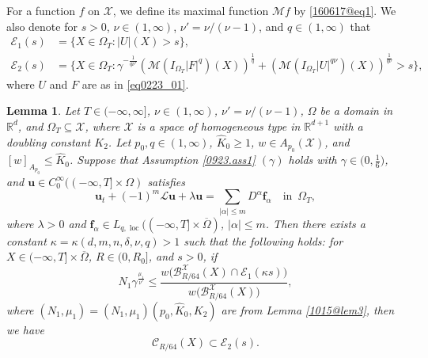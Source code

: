 \documentclass[reqno]{amsart}
\numberwithin{equation}{section}
\theoremstyle{plain}
\newtheorem{lemma}[theorem]{Lemma}
\theoremstyle{definition}
\theoremstyle{remark}
\begin{document}
For a function $f$ on ${\mathcal{X}}$, we define its maximal function ${\mathcal{M}} f$ by \eqref{160617@eq1}.
We also denote for $s>0$,  $\nu\in (1,\infty)$, $\nu'=\nu/(\nu-1)$, and $q\in (1,\infty)$ that 
\begin{equation}		\label{1008@eq1}
\begin{aligned}
{\mathcal{E}}_1(s)&=\{X\in \Omega_T: |U|(X)>s\},\\
{\mathcal{E}}_2(s)&=\big\{X\in  \Omega_T:\gamma^{-\frac{1}{q\nu'}}({\mathcal{M}}(I_{\Omega_T}|F|^{q})(X))^{\frac{1}{q}}+({\mathcal{M}}(I_{\Omega_T}|U|^{q\nu})(X))^{\frac{1}{q\nu}}>s\big\},
\end{aligned}
\end{equation}
where $U$ and $F$ are as in \eqref{eq0223_01}.

\begin{lemma}		\label{1015@lem1}
Let $T \in (-\infty,\infty]$, $\nu \in (1,\infty)$, $\nu' = \nu/(\nu-1)$, $\Omega$ be a domain in ${\mathbb{R}}^d$,  and $\Omega_T\subseteq {\mathcal{X}}$, where ${\mathcal{X}}$ is  a space of homogeneous type in ${\mathbb{R}}^{d+1}$ with a doubling constant $K_2$.
Let 
$p_0,q\in (1,\infty)$, $\hat{K}_0\ge 1$, $w\in A_{p_0}({\mathcal{X}})$, and $[w]_{A_{p_0}}\le \hat{K}_0$.
Suppose that  Assumption \ref{0923.ass1} $(\gamma)$ holds with $\gamma\in \big(0,\frac{1}{6}\big)$, and ${\boldsymbol{u}}\in C^\infty_0((-\infty,T]\times \Omega)$ satisfies
\begin{equation*}		
{\boldsymbol{u}}_t+(-1)^m{\mathcal{L}}{\boldsymbol{u}}+\lambda{\boldsymbol{u}}=\sum_{|\alpha| \le m}D^\alpha {\boldsymbol{f}}_\alpha \quad \text{in }\,  \Omega_T,
\end{equation*}
where $\lambda>0$ and ${\boldsymbol{f}}_\alpha\in L_{q,\operatorname{loc}}((-\infty,T] \times \overline{\Omega})$, $|\alpha|\le m$.
Then there exists a constant $\kappa=\kappa(d,m,n,\delta,\nu,q)>1$ such that the following holds: for $X\in (-\infty,T]\times\overline{\Omega}$, $R\in (0,R_0]$, and $s>0$,
if
\begin{equation*}		
N_1\gamma^{\frac{\mu_1}{\nu'}}\le\frac{w\big({\mathcal{B}}_{R/64}^{\mathcal{X}}(X)\cap {\mathcal{E}}_1(\kappa s)\big)}{w\big({\mathcal{B}}_{R/64}^{\mathcal{X}}(X)\big)},
\end{equation*}
where $(N_1,\mu_1)=(N_1,\mu_1)(p_0,\hat{K}_0,K_2)$ are from Lemma \ref{1015@lem3}, then we have 
\begin{equation}		\label{1015@eq1a}
{\mathcal{C}}_{R/64}(X) \subset {\mathcal{E}}_2(s).
\end{equation}
\end{lemma}
\end{document}
